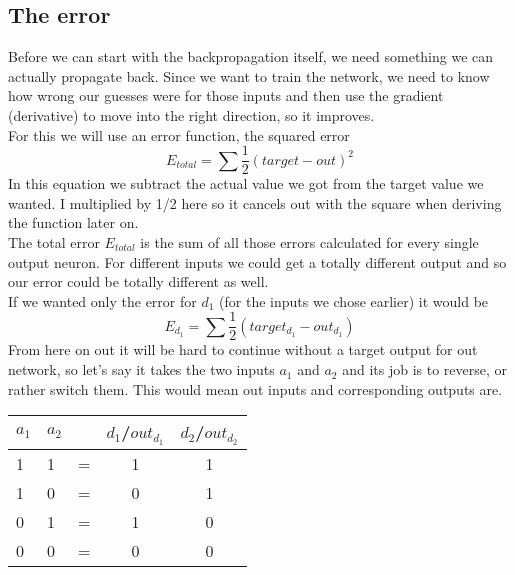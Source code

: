 \documentclass[11pt, halfparskip]{article}
\begin{document}
     \subsection{The error}
     \label{sec:the:error}
     Before we can start with the backpropagation itself, we need something we can actually propagate back. Since we want to train the network, we need to know how wrong our
     guesses were for those inputs and then use the gradient (derivative) to move into the right direction, so it improves.\\
     For this we will use an error function, the squared error 
     \begin{equation}
     	E_{total} = \sum \frac{1}{2}(target - out)^2
    \end{equation}
    In this equation we subtract the actual value we got from the target value we wanted. I multiplied by 1/2 here so it cancels out with the square when deriving the function later on.\\
    The total error $E_{total}$ is the sum of all those errors calculated for every single output neuron. For different inputs we could get a totally different output and so our error could 
    be totally different as well. \\
    If we wanted only the error for $d_1$ (for the inputs we chose earlier) it would be 
    \[
    	E_{d_1} = \sum \frac{1}{2}(target_{d_1} - out_{d_1})
    \]
    From here on out it will be hard to continue without a target output for out network, so let's say it takes the two inputs $a_1$ and $a_2$ and its job is to reverse, or rather switch
     them. This would mean out inputs and corresponding outputs are.
    \begin{center}
	    \begin{tabular}{l l c c c}
	    	$a_1$ & $a_2$ &  & $d_1$/$out_{d_1}$ & $d_2$/$out_{d_2}$\\
    		\hline
	    	1 & 1 & = & 1 & 1\\
    		1 & 0 & = & 0 & 1\\
	    	0 & 1 & = & 1 & 0\\
    		0 & 0 & = & 0 & 0
    	\end{tabular}
    \end{center}
\end{document}
